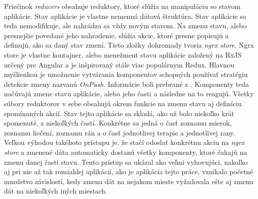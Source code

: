 Priečinok \textit{reducers} obsahuje reduktory, ktoré slúžia na manipuláciu so stavom aplikácie. Stav aplikácie je vlastne nemenná dátová štruktúra. Stav aplikácie sa teda nemodifikuje, ale nahrádza sa vždy novým stavom. Na zmenu stavu, alebo presnejšie povedané jeho nahradenie, slúžia akcie, ktoré presne popisujú a definujú, ako sa daný stav zmení. Tieto zložky dohromady tvoria \textit{ngrx store}. Ngrx store je vlastne kontajner, alebo menežment stavu aplikácie založený na RxJS určený pre Angular a je inšpirovaný stále viac populárnym Redux. Hlavnou myšlienkou je umožnenie vytvárania komponentov schopných používať stratégiu detekcie zmeny nazvanú \textit{OnPush}. Informácie boli prebrané z \cite{nic5zZJbUwJyjA3R}. Komponenty teda načúvajú zmene stavu aplikácie, alebo jeho časti a následne na to reagujú. Všetky súbory reduktorov v sebe obsahujú okrem funkcie na zmenu stavu aj definíciu spomínaných akcií. Stav tejto aplikácie sa skladá, ako už bolo niekoľko krát spomenuté, z niekoľkých častí. Konkrétne sa jedná o časť zoznamu mierok, zoznamu liečení, zoznamu rán a o časť jednotlivej terapie a jednotlivej rany. Veľkou výhodou takéhoto prístupu je, že stačí odoslať konkrétnu akciu na \textit{ngrx store} a zmenené dáta automaticky dostanú všetky komponenty, ktoré čakajú na zmenu danej časti stavu. Tento prístup sa ukázal ako veľmi vyhovujúci, nakoľko aj pri nie až tak rozsiahlej aplikácií, ako je aplikácia tejto práce, vznikalo početné množstvo závislostí, kedy zmena dát na nejakom mieste  vyžadovala ešte aj zmenu dát na niekoľkých iných miestach.

